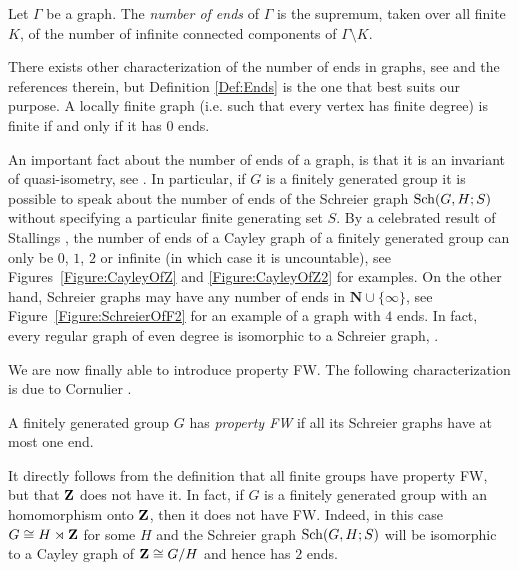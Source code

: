\begin{defn}\label{Def:Ends}
Let $\Gamma$ be a graph. The \emph{number of ends} of $\Gamma$ is the supremum, taken over all finite $K$, of the number of infinite connected components of $\Gamma\setminus K$.
\end{defn}
There exists other characterization of the number of ends in graphs, %
see \cite{MR1967888} and the references therein, but Definition \ref{Def:Ends} is the one that best suits our purpose.
A locally finite graph (i.e. such that every vertex has finite degree) is finite if and only if it has $0$ ends.

An important fact about the number of ends of a graph, is that it is an invariant of quasi-isometry, see \cite{MR1213151}. In particular, if $G$ is a finitely generated group it is possible to speak about the number of ends of the Schreier graph $\operatorname{Sch}(G,H;S)$ without specifying a particular finite generating set $S$.
By a celebrated result of Stallings \cite{Stallings1971}, the number of ends of a Cayley graph of a finitely generated group can only be $0$, $1$, $2$ or infinite (in which case it is uncountable), see Figures~\ref{Figure:CayleyOfZ} and \ref{Figure:CayleyOfZ2} for examples.
On the other hand, Schreier graphs may have any number of ends in $\mathbf N\cup\{\infty\}$, see Figure~\ref{Figure:SchreierOfF2} for an example of a graph with $4$ ends.
In fact, every regular graph of even degree is isomorphic to a Schreier graph, \cite{MR0450121,MR1358635}. 

We are now finally able to introduce property FW. The following characterization is due to Cornulier \cite{Cornulier2013}.
%
%
\begin{defn}
A finitely generated group $G$ has \emph{property FW} if all its Schreier graphs have at most one end.
\end{defn}
%
%
It directly follows from the definition that all finite groups have property FW, but that $\mathbf{Z}$ does not have it.
In fact, if $G$ is a finitely generated group with an homomorphism onto $\mathbf{Z}$, then it does not have FW. Indeed, in this case $G\cong H\rtimes \mathbf{Z}$  for some $H$ and the Schreier graph $\operatorname{Sch}(G,H;S)$ will be isomorphic to a Cayley graph of $\mathbf{Z}\cong G/H$ and hence has $2$ ends.

